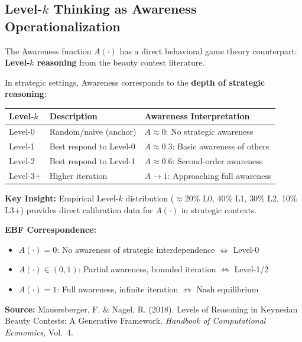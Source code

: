 
\subsection{Level-$k$ Thinking as Awareness Operationalization}
\label{sec:au-level-k}

The Awareness function $A(\cdot)$ has a direct behavioral game theory counterpart:
\textbf{Level-$k$ reasoning} from the beauty contest literature.

\begin{tcolorbox}[colback=yellow!5!white, colframe=yellow!75!black,
    title=\textbf{Mauersberger \& Nagel (2018): Level-$k$ as Bounded Awareness}]

In strategic settings, Awareness corresponds to the \textbf{depth of strategic reasoning}:

\begin{center}
\renewcommand{\arraystretch}{1.3}
\begin{tabular}{@{}p{2.5cm}p{4cm}p{5.5cm}@{}}
\toprule
\textbf{Level-$k$} & \textbf{Description} & \textbf{Awareness Interpretation} \\
\midrule
Level-0 & Random/naive (anchor) & $A \approx 0$: No strategic awareness \\
Level-1 & Best respond to Level-0 & $A \approx 0.3$: Basic awareness of others \\
Level-2 & Best respond to Level-1 & $A \approx 0.6$: Second-order awareness \\
Level-3+ & Higher iteration & $A \to 1$: Approaching full awareness \\
\bottomrule
\end{tabular}
\end{center}

\textbf{Key Insight:} Empirical Level-$k$ distribution ($\approx$20\% L0, 40\% L1, 30\% L2, 10\% L3+)
provides direct calibration data for $A(\cdot)$ in strategic contexts.

\textbf{EBF Correspondence:}
\begin{itemize}[nosep]
    \item $A(\cdot) = 0$: No awareness of strategic interdependence $\Leftrightarrow$ Level-0
    \item $A(\cdot) \in (0,1)$: Partial awareness, bounded iteration $\Leftrightarrow$ Level-1/2
    \item $A(\cdot) = 1$: Full awareness, infinite iteration $\Leftrightarrow$ Nash equilibrium
\end{itemize}

\textbf{Source:} Mauersberger, F. \& Nagel, R. (2018). Levels of Reasoning in Keynesian
Beauty Contests: A Generative Framework. \textit{Handbook of Computational Economics}, Vol.\ 4.

\end{tcolorbox}

